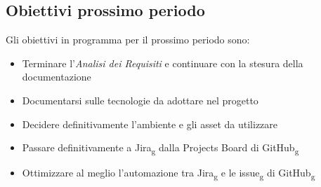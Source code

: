 \subsection{Obiettivi prossimo periodo}
Gli obiettivi in programma per il prossimo periodo sono:
\begin{itemize}
\item Terminare l'\textit{Analisi dei Requisiti} e continuare con la stesura della documentazione
\item Documentarsi sulle tecnologie da adottare nel progetto
\item Decidere definitivamente l'ambiente e gli asset da utilizzare
\item Passare definitivamente a Jira\textsubscript{g} dalla Projects Board di GitHub\textsubscript{g}
\item Ottimizzare al meglio l'automazione tra Jira\textsubscript{g} e le issue\textsubscript{g} di GitHub\textsubscript{g}
\end{itemize}
